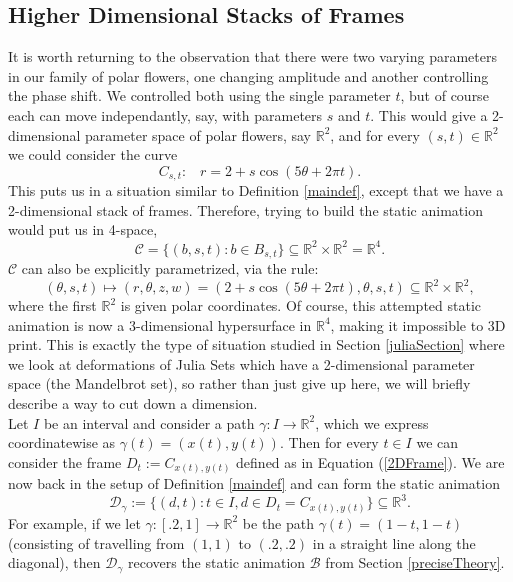\documentclass[12 pt]{article}
\newcommand{\bR}{\mathbb{R}}
\newcommand{\cB}{\mathcal{B}}
\newcommand{\cC}{\mathcal{C}}
\newcommand{\cD}{\mathcal{D}}
\begin{document}
\subsection{Higher Dimensional Stacks of Frames}\label{HDF}
It is worth returning to the observation that there were two varying parameters in our family of polar flowers, one changing amplitude and another controlling the phase shift.  We controlled both using the single parameter $t$, but of course each can move independantly, say, with parameters $s$ and $t$.  This would give a 2-dimensional parameter space of polar flowers, say $\bR^2$, and for every $(s,t)\in\bR^2$ we could consider the curve
\begin{equation}\label{2DFrame}
C_{s,t}:\hspace{10pt} r = 2 + s\cos(5\theta + 2\pi t).
\end{equation}
This puts us in a situation similar to Definition \ref{maindef}, except that we have a 2-dimensional stack of frames.  Therefore, trying to build the static animation would put us in 4-space,
\[{\cC} = \{(b,s,t):b\in B_{s,t}\}\subseteq \bR^2\times\bR^2 = \bR^4.\]
${\cC}$ can also be explicitly parametrized, via the rule:
\[(\theta,s,t)\mapsto (r,\theta, z,w) = (2 + s\cos(5\theta + 2\pi t),\theta,s,t)\subseteq\bR^2\times\bR^2,\]
where the first $\bR^2$ is given polar coordinates.  Of course, this attempted static animation is now a 3-dimensional hypersurface in $\bR^4$, making it impossible to 3D print.  This is exactly the type of situation studied in Section \ref{juliaSection} where we look at deformations of Julia Sets which have a 2-dimensional parameter space (the Mandelbrot set), so rather than just give up here, we will briefly describe a way to cut down a dimension.\\

Let $I$ be an interval and consider a path $\gamma:I\to\bR^2$, which we express coordinatewise as $\gamma(t) = (x(t),y(t))$.   Then for every $t\in I$ we can consider the frame $D_t:=C_{x(t),y(t)}$ defined as in Equation (\ref{2DFrame}).  We are now back in the setup of Definition \ref{maindef} and can form the static animation
\[\cD_\gamma:=\{(d,t):t\in I, d\in D_t = C_{x(t),y(t)}\}\subseteq\bR^3.\]
For example, if we let $\gamma:[.2,1]\to\bR^2$ be the path $\gamma(t) = (1-t,1-t)$ (consisting of travelling from $(1,1)$ to $(.2,.2)$ in a straight line along the diagonal), then $\cD_\gamma$ recovers the static animation $\cB$ from Section \ref{preciseTheory}.\\
\end{document}
